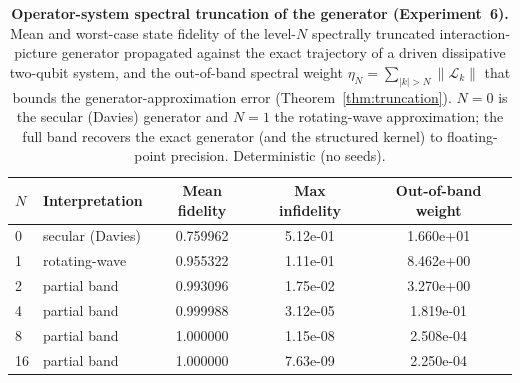 \documentclass[11pt]{article}
\newcommand{\calL}{\mathcal{L}}
\newcommand{\norm}[1]{\left\lVert #1 \right\rVert}
\newcommand{\sync}[1]{#1}
\begin{document}
\begin{table}[ht]
\centering
\caption{\textbf{Operator-system spectral truncation of the generator (Experiment~6).} Mean and worst-case state fidelity of the level-$N$ spectrally truncated interaction-picture generator propagated against the exact trajectory of a driven dissipative two-qubit system, and the out-of-band spectral weight $\eta_N=\sum_{|k|>N}\norm{\calL_k}$ that bounds the generator-approximation error (Theorem~\ref{thm:truncation}). $N{=}0$ is the secular (Davies) generator and $N{=}1$ the rotating-wave approximation; the full band recovers the exact generator (and the structured kernel) to floating-point precision. Deterministic (no seeds).}
\label{tab:exp6}
\begin{tabular}{llccc}
\toprule
$N$ & Interpretation & Mean fidelity & Max infidelity & Out-of-band weight \\
\midrule
0 & secular (Davies) & \sync{0.759962} & \sync{5.12e-01} & \sync{1.660e+01} \\
1 & rotating-wave & \sync{0.955322} & \sync{1.11e-01} & \sync{8.462e+00} \\
2 & partial band & \sync{0.993096} & \sync{1.75e-02} & \sync{3.270e+00} \\
4 & partial band & \sync{0.999988} & \sync{3.12e-05} & \sync{1.819e-01} \\
8 & partial band & \sync{1.000000} & \sync{1.15e-08} & \sync{2.508e-04} \\
16 & partial band & \sync{1.000000} & \sync{7.63e-09} & \sync{2.250e-04} \\
\bottomrule
\end{tabular}
\end{table}
\end{document}
